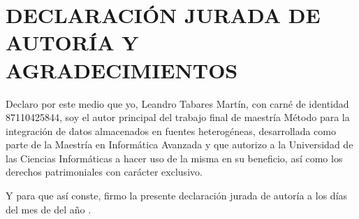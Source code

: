 \chapter*{\large DECLARACIÓN JURADA DE AUTORÍA Y AGRADECIMIENTOS}

\lhead{}
\chead{}
\lfoot{}
\cfoot{}
\rfoot{\thepage}
\renewcommand{\headrulewidth}{0.4pt}

Declaro por este medio que yo, Leandro Tabares Martín, con carné de identidad 87110425844, soy el autor principal del trabajo final de maestría Método para la integración de datos almacenados en fuentes heterogéneas, desarrollada como parte de la Maestría en Informática Avanzada y que autorizo a la Universidad de las Ciencias Informáticas a hacer uso de la misma en su beneficio, así como los derechos patrimoniales con carácter exclusivo.

\espacios

Y para que así conste, firmo la presente declaración jurada de autoría a los \fillDia días del mes de \fillMes del año \fillAnno.

\espacios
\espacios

\firmaTesis

